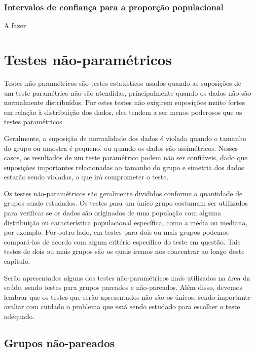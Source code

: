 \documentclass[
  letterpaper,
  DIV=11,
  numbers=noendperiod]{scrreprt}
\begin{document}
\hypertarget{intervalos-de-confianuxe7a-para-a-proporuxe7uxe3o-populacional}{%
\subsection{Intervalos de confiança para a proporção
populacional}\label{intervalos-de-confianuxe7a-para-a-proporuxe7uxe3o-populacional}}

A fazer


\hypertarget{testes-nuxe3o-paramuxe9tricos}{%
\chapter{Testes não-paramétricos}\label{testes-nuxe3o-paramuxe9tricos}}

Testes não paramétricos são testes estatísticos usados quando as
suposições de um teste paramétrico não são atendidas, principalmente
quando os dados não são normalmente distribuídos. Por estes testes não
exigirem suposições muito fortes em relação à distribuição dos dados,
eles tendem a ser menos poderosos que os testes paramétricos.

Geralmente, a suposição de normalidade dos dados é violada quando o
tamanho do grupo ou amostra é pequeno, ou quando os dados são
assimétricos. Nesses casos, os resultados de um teste paramétrico podem
não ser confiáveis, dado que suposições importantes relacionadas ao
tamanho do grupo e simetria dos dados estarão sendo violadas, o que irá
comprometer o teste.

Os testes não-paramétricos são geralmente divididos conforme a
quantidade de grupos sendo estudados. Os testes para um único grupo
costumam ser utilizados para verificar se os dados são originados de uma
população com alguma distribuição ou característica populacional
específica, como a média ou mediana, por exemplo. Por outro lado, em
testes para dois ou mais grupos podemos compará-los de acordo com algum
critério específico do teste em questão. Tais testes de dois ou mais
grupos são os quais iremos nos concentrar ao longo deste capítulo.

Serão apresentados alguns dos testes não-paramétricos mais utilizados na
área da saúde, sendo testes para grupos pareados e não-pareados. Além
disso, devemos lembrar que os testes que serão apresentados não são os
únicos, sendo importante avaliar com cuidado o problema que está sendo
estudado para escolher o teste adequado.

\hypertarget{grupos-nuxe3o-pareados}{%
\section{Grupos não-pareados}\label{grupos-nuxe3o-pareados}}
\end{document}
